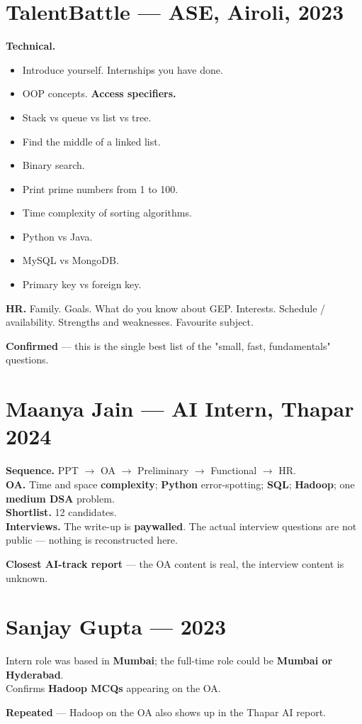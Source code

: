 \documentclass[11pt,a4paper]{article}
\newcommand{\tg}[1]{\textcolor{tag}{\textbf{\footnotesize #1}}}
\newcommand{\rnd}[1]{\textcolor{accent}{\textbf{#1}}}
\newcommand{\q}[1]{\textcolor{qcol}{#1}}
\newcommand{\card}[1]{%
  \par\vspace{5pt}%
  \noindent\colorbox{soft}{%
    \parbox{\dimexpr\textwidth-2\fboxsep}{\vspace{6pt}#1\vspace{6pt}}%
  }\par\vspace{7pt}%
}
\begin{document}
\section{TalentBattle --- ASE, Airoli, 2023}
\card{
\rnd{Technical.}
\begin{itemize}
  \item Introduce yourself. \quad Internships you have done.
  \item OOP concepts. \quad \textbf{Access specifiers.}
  \item \q{Stack vs queue vs list vs tree.}
  \item \q{Find the middle of a linked list.}
  \item \q{Binary search.}
  \item \q{Print prime numbers from 1 to 100.}
  \item \q{Time complexity of sorting algorithms.}
  \item \q{Python vs Java.}
  \item \q{MySQL vs MongoDB.}
  \item \q{Primary key vs foreign key.}
\end{itemize}
\vspace{3pt}
\rnd{HR.} Family. \quad Goals. \quad What do you know about GEP. \quad Interests. \quad Schedule / availability. \quad Strengths and weaknesses. \quad Favourite subject.
}
\tg{Confirmed} --- this is the single best list of the "small, fast, fundamentals" questions.

\section{Maanya Jain --- AI Intern, Thapar 2024}
\card{
\rnd{Sequence.} PPT $\rightarrow$ OA $\rightarrow$ Preliminary $\rightarrow$ Functional $\rightarrow$ HR.\\[5pt]
\rnd{OA.} Time and space \textbf{complexity}; \textbf{Python} error-spotting; \textbf{SQL}; \textbf{Hadoop}; one \textbf{medium DSA} problem.\\[5pt]
\rnd{Shortlist.} 12 candidates.\\[5pt]
\rnd{Interviews.} The write-up is \textbf{paywalled}. The actual interview questions are not public --- nothing is reconstructed here.
}
\tg{Closest AI-track report} --- the OA content is real, the interview content is unknown.

\section{Sanjay Gupta --- 2023}
\card{
Intern role was based in \textbf{Mumbai}; the full-time role could be \textbf{Mumbai or Hyderabad}.\\[4pt]
Confirms \textbf{Hadoop MCQs} appearing on the OA.
}
\tg{Repeated} --- Hadoop on the OA also shows up in the Thapar AI report.
\end{document}
